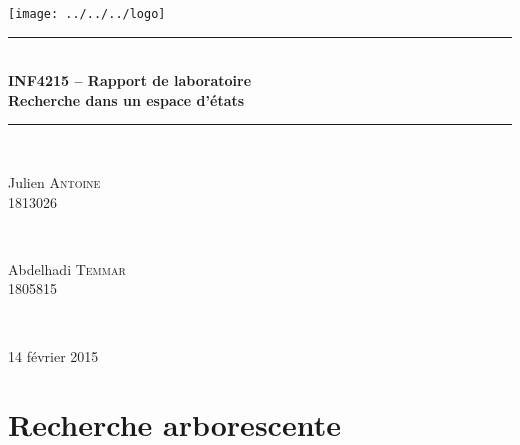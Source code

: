 \documentclass[12pt]{article}
\begin{document}


\begin{titlepage}
\newcommand{\HRule}{\rule{\linewidth}{0.5mm}} %
\center %
\raggedright
\texttt{[image: ../../../logo]}\\[6cm] 
\centering
\HRule \\[0.4cm]
{ \huge \bfseries INF4215 -- Rapport de laboratoire}\\[0.4cm]
{ \Large \bfseries Recherche dans un espace d'états}\\%
\HRule \\[1cm]
\begin{minipage}{0.45\textwidth}
\begin{center} \large
Julien \textsc{Antoine}\\
1813026
\end{center}
\end{minipage}
~
\begin{minipage}{0.45\textwidth}
\begin{center} \large
Abdelhadi \textsc{Temmar}\\
1805815
\end{center}
\end{minipage}\\[8cm]
\begin{center}
{\large 14 février 2015}
\end{center}
\vfill %
\end{titlepage}



\section{Recherche arborescente}
\end{document}
